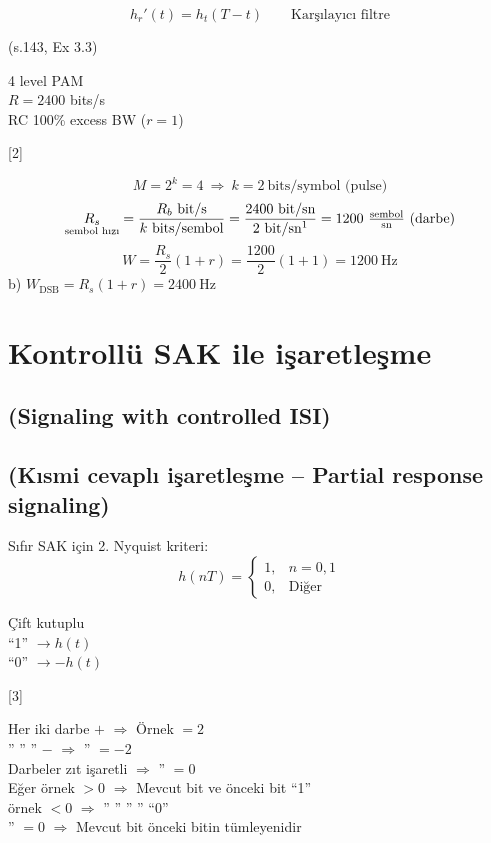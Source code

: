 \documentclass[11pt,a4paper]{article}
\begin{document}
\[ h_r'(t)=h_t(T-t)\qquad \text{Karşılayıcı filtre} \]

\begin{ornek}[3.3]
(s.143, Ex 3.3)


4 level PAM\\
$R=2400$ bits/s\\
RC 100\% excess BW ($r=1$)

[2]
\end{ornek}

\[ M=2^k=4\ \Rightarrow\ k=2\ \text{bits/symbol (pulse)} \]
\[ \underset{\text{sembol hızı}}{R_s}=\frac{R_b\ \text{bit/s}}{k\ \text{bits/sembol}}=\frac{2400\ \text{bit/sn}}{2\ \text{bit/sn}\footnotemark}=1200\ \tfrac{\text{sembol}}{\text{sn}}\ \text{(darbe)} \]
\[ W=\frac{R_s}{2}(1+r)=\frac{1200}{2}(1+1)=1200\ \mathrm{Hz} \]
b) $W_{\mathrm{DSB}}=R_s(1+r)=2400\ \mathrm{Hz}$

\section{Kontrollü SAK ile işaretleşme}
\subsection{(Signaling with controlled ISI)}
\subsection{(Kısmi cevaplı işaretleşme -- Partial response signaling)}

Sıfır SAK için 2. Nyquist kriteri:
\[ h(nT)=\begin{cases} 1, & n=0,1\\ 0, & \text{Diğer}\end{cases} \]

Çift kutuplu\\
``1'' $\rightarrow h(t)$\\
``0'' $\rightarrow -h(t)$

[3]

Her iki darbe $+$ $\Rightarrow$ Örnek $=2$\\
'' '' '' $-$ $\Rightarrow$ '' $=-2$\\
Darbeler zıt işaretli $\Rightarrow$ '' $=0$\\
Eğer örnek $>0$ $\Rightarrow$ Mevcut bit ve önceki bit ``1''\\
\hspace*{1.5em}örnek $<0$ $\Rightarrow$ '' '' '' '' ``0''\\
\hspace*{1.5em}'' $=0$ $\Rightarrow$ Mevcut bit önceki bitin tümleyenidir
\end{document}
